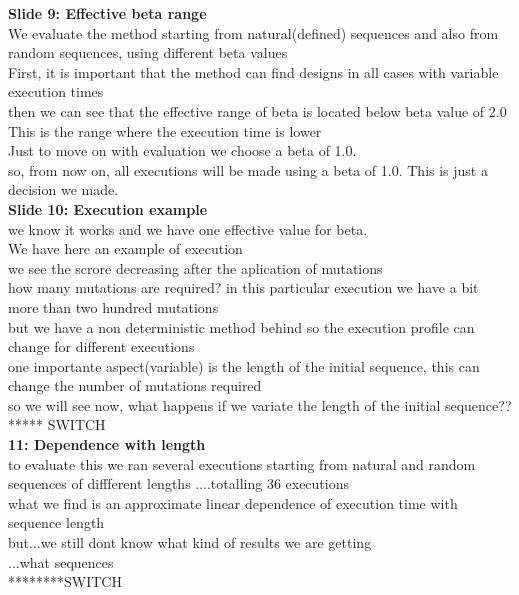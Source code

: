 \documentclass[a4paper,10pt]{article}
\begin{document}
\textbf{Slide 9: Effective beta range}\\
We evaluate the method starting from natural(defined) sequences and also from random sequences, using different beta values\\
First, it is important that the method can find designs in all cases with variable execution times\\
then we can see that the effective range of beta is located below beta value of 2.0\\
This is the range where the execution time is lower\\
Just to move on with evaluation we choose a beta of 1.0.\\
so, from now on, all executions will be made using a beta of 1.0. This is just a decision we made.\\


\textbf{Slide 10: Execution example}\\
we know it works and we have one effective value for beta.\\
We have here an example of execution\\
we see the scrore decreasing after the aplication of mutations\\
how many mutations are required? in this particular execution we have a bit more than two hundred mutations\\ 
but we have a non deterministic method behind so the execution profile can change for different executions\\
one importante aspect(variable) is the length of the initial sequence, this can change the number of mutations required\\
so we will see now, what happens if we variate the length of the initial sequence?? ***** SWITCH\\


\textbf{11: Dependence with length}\\
to evaluate this we ran several executions starting from natural and random sequences of diffferent lengths ....totalling 36 executions\\
what we find is an approximate linear dependence of execution time with sequence length\\
but...we still dont know what kind of results we are getting\\
...what sequences\\
********SWITCH\\
\end{document}
